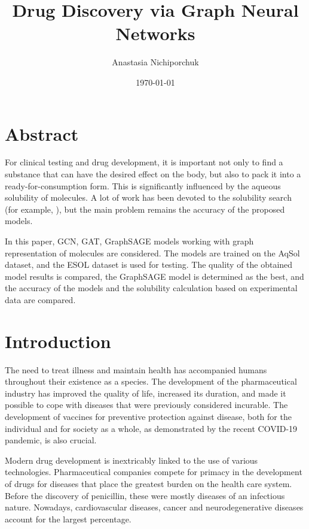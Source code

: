 \documentclass[a4paper,14pt]{article}
\author{Anastasia Nichiporchuk}
\title{Drug Discovery via Graph Neural Networks}
\date{\today}
\begin{document}
\maketitle

\newpage
\tableofcontents
\newpage

\section*{Abstract}
For clinical testing and drug development, it is important not only to find a substance that can have the desired effect on the body, but also to pack it into a ready-for-consumption form. This is significantly influenced by the aqueous solubility of molecules. A lot of work has been devoted to the solubility search (for example, \cite{Sol1} \cite{Sol2}), but the main problem remains the accuracy of the proposed models. 

In this paper, GCN, GAT, GraphSAGE models working with graph representation of molecules are considered. The models are trained on the AqSol dataset, and the ESOL dataset is used for testing. The quality of the obtained model results is compared, the GraphSAGE model is determined as the best, and the accuracy of the models and the solubility calculation based on experimental data are compared.

\section{Introduction}\label{1}

The need to treat illness and maintain health has accompanied humans throughout their existence as a species. The development of the pharmaceutical industry has improved the quality of life, increased its duration, and made it possible to cope with diseases that were previously considered incurable. The development of vaccines for preventive protection against disease, both for the individual and for society as a whole, as demonstrated by the recent COVID-19 pandemic, is also crucial. 

Modern drug development is inextricably linked to the use of various technologies. Pharmaceutical companies compete for primacy in the development of drugs for diseases that place the greatest burden on the health care system. Before the discovery of penicillin, these were mostly diseases of an infectious nature. Nowadays, cardiovascular diseases, cancer and neurodegenerative diseases account for the largest percentage.
\end{document}

